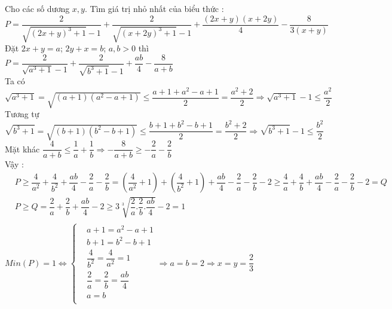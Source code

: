 \begin{ex}%
    Cho các số dương $x, y$. Tìm giá trị nhỏ nhất của biểu thức : \\
    $P=\dfrac{2}{\sqrt{(2x+y)^3+1}-1}+\dfrac{2}{\sqrt{(x+2y)^3+1}-1}+\dfrac{(2x+y)(x+2y)}{4}-\dfrac{8}{3(x+y)}$
\loigiai
    {
    Đặt $2x+y=a$; $2y+x=b$; $a, b >0$ thì 
    $P=\dfrac{2}{\sqrt{a^3+1}-1}+\dfrac{2}{\sqrt{b^3+1}-1}+\dfrac{ab}{4}-\dfrac{8}{a+b}$\\
    Ta có $\sqrt{a^3+1}=\sqrt{(a+1)(a^2-a+1)}\le \dfrac{a+1+a^2-a+1}{2}=\dfrac{a^2+2}{2}\Rightarrow \sqrt{a^3+1}-1\le \dfrac{a^2}{2}$\\
    Tương tự $\sqrt{b^3+1}=\sqrt{(b+1)(b^2-b+1)}\le \dfrac{b+1+b^2-b+1}{2}=\dfrac{b^2+2}{2}\Rightarrow \sqrt{b^3+1}-1\le \dfrac{b^2}{2}$\\
    Mặt khác $\dfrac{4}{a+b}\le \dfrac{1}{a}+\dfrac{1}{b}\Rightarrow -\dfrac{8}{a+b}\ge -\dfrac{2}{a}-\dfrac{2}{b}$\\
    Vậy : \\ $\begin{aligned}
    & P\ge \dfrac{4}{a^2}+\dfrac{4}{b^2}+\dfrac{ab}{4}-\dfrac{2}{a}-\dfrac{2}{b}=(\dfrac{4}{a^2}+1)+(\dfrac{4}{b^2}+1)+\dfrac{ab}{4}-\dfrac{2}{a}-\dfrac{2}{b}-2\ge \dfrac{4}{a}+\dfrac{4}{b}+\dfrac{ab}{4}-\dfrac{2}{a}-\dfrac{2}{b}-2=Q \\ 
    & P\ge Q=\dfrac{2}{a}+\dfrac{2}{b}+\dfrac{ab}{4}-2\ge 3\sqrt[3]{\dfrac{2}{a}. \dfrac{2}{b}. \dfrac{ab}{4}}-2=1 \\ 
    \end{aligned}$
    $Min(P)=1\Leftrightarrow \begin{cases} & a+1=a^2-a+1 \\  & b+1=b^2-b+1 \\ 
    & \dfrac{4}{b^2}=\dfrac{4}{a^2}=1 \\ 
    & \dfrac{2}{a}=\dfrac{2}{b}=\dfrac{ab}{4} \\ 
    & a=b \\  \end{cases} \Rightarrow a=b=2\Rightarrow x=y=\dfrac{2}{3}$
        }
\end{ex}


